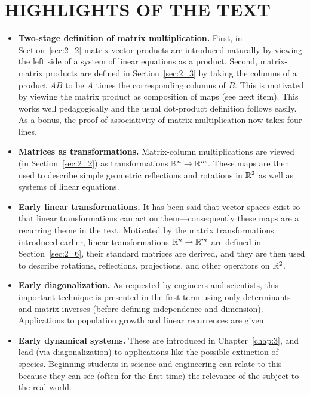 \vspace*{-2em}
\section*{HIGHLIGHTS OF THE TEXT}

\begin{itemize}
\item \textbf{Two-stage definition of matrix multiplication.} First, in Section~\ref{sec:2_2}
 matrix-vector products are introduced naturally by viewing the left 
side of a system of linear equations as a product. Second, matrix-matrix
 products are defined in Section~\ref{sec:2_3} by taking the columns of a product $AB$ to be $A$ times the corresponding columns of $B$.
 This is motivated by viewing the matrix product as composition of maps 
(see next item). This works well pedagogically and the usual dot-product
 definition follows easily. As a bonus, the proof of associativity of 
matrix multiplication now takes four lines.

\item \textbf{Matrices as transformations.} Matrix-column multiplications are viewed (in Section~\ref{sec:2_2}) as transformations $\mathbb{R}^n \to  \mathbb{R}^m$. These maps are then used to describe simple geometric reflections and rotations in $\mathbb{R}^2$ as well as systems of linear equations.

\item \textbf{Early linear transformations.}
 It has been said that vector spaces exist so that linear 
transformations can act on them---consequently these maps are a recurring 
theme in the text. Motivated by the matrix transformations introduced 
earlier, linear transformations $\mathbb{R}^n \to  \mathbb{R}^m$ are defined in Section~\ref{sec:2_6},
 their standard matrices are derived, and they are then used to describe
 rotations, reflections, projections, and other operators on $\mathbb{R}^2$.

\item \textbf{Early diagonalization.}
 As requested by engineers and scientists, this important technique is 
presented in the first term using only determinants and matrix inverses 
(before defining independence and dimension). Applications to population
 growth and linear recurrences are given.

\item \textbf{Early dynamical systems.} These are introduced in Chapter~\ref{chap:3},
 and lead (via diagonalization) to applications like the possible 
extinction of species. Beginning students in science and engineering can
 relate to this because they can see (often for the first time) the 
relevance of the subject to the real world.


\end{itemize}
